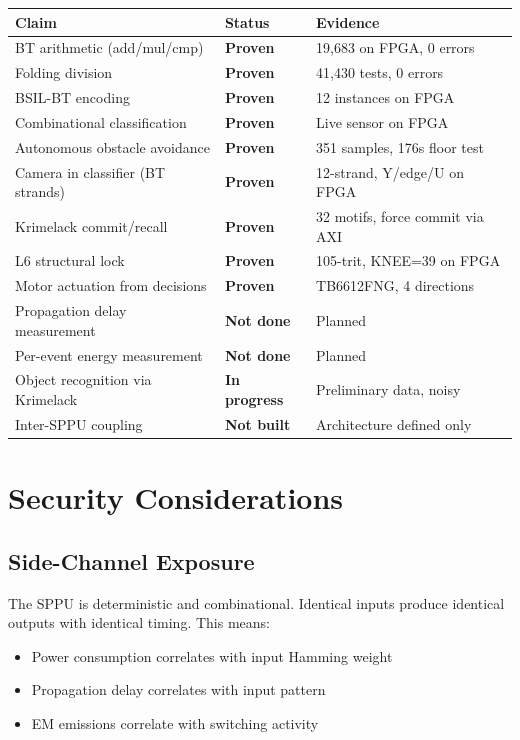 \documentclass[11pt, a4paper]{article}
\begin{document}
\begin{center}
\begin{tabular}{@{}lll@{}}
\toprule
\textbf{Claim} & \textbf{Status} & \textbf{Evidence} \\
\midrule
BT arithmetic (add/mul/cmp) & \textbf{Proven} & 19,683 on FPGA, 0 errors \\
Folding division & \textbf{Proven} & 41,430 tests, 0 errors \\
BSIL-BT encoding & \textbf{Proven} & 12 instances on FPGA \\
Combinational classification & \textbf{Proven} & Live sensor on FPGA \\
Autonomous obstacle avoidance & \textbf{Proven} & 351 samples, 176s floor test \\
Camera in classifier (BT strands) & \textbf{Proven} & 12-strand, Y/edge/U on FPGA \\
Krimelack commit/recall & \textbf{Proven} & 32 motifs, force commit via AXI \\
L6 structural lock & \textbf{Proven} & 105-trit, KNEE=39 on FPGA \\
Motor actuation from decisions & \textbf{Proven} & TB6612FNG, 4 directions \\
\midrule
Propagation delay measurement & \textbf{Not done} & Planned \\
Per-event energy measurement & \textbf{Not done} & Planned \\
Object recognition via Krimelack & \textbf{In progress} & Preliminary data, noisy \\
Inter-SPPU coupling & \textbf{Not built} & Architecture defined only \\
\bottomrule
\end{tabular}
\end{center}

\section{Security Considerations}

\subsection{Side-Channel Exposure}

The SPPU is deterministic and combinational. Identical inputs
produce identical outputs with identical timing. This means:
\begin{itemize}[nosep]
  \item Power consumption correlates with input Hamming weight
  \item Propagation delay correlates with input pattern
  \item EM emissions correlate with switching activity
\end{itemize}
\end{document}
